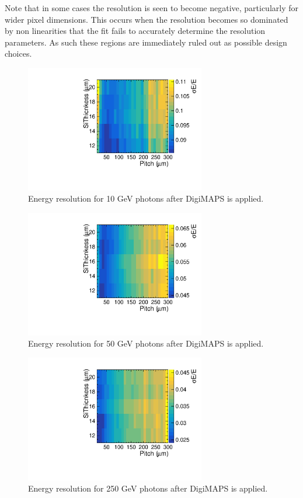 Note that in some cases the resolution is seen to become negative, particularly for wider pixel dimensions. This occurs when the resolution becomes so dominated by non linearities that the fit fails to accurately determine the resolution parameters. As such these regions are immediately ruled out as possible design choices.

\begin{figure}
  \centering
  \includegraphics[width=0.7\textwidth,keepaspectratio]{DECALStudies/fig/FullDigiRes10.pdf}
  \caption{Energy resolution for 10 GeV photons after DigiMAPS is applied.}
  \label{fig:resolution10Digi}
\end{figure}

\begin{figure}
  \centering
  \includegraphics[width=0.7\textwidth,keepaspectratio]{DECALStudies/fig/FullDigiRes50.pdf}
  \caption{Energy resolution for 50 GeV photons after DigiMAPS is applied.}
  \label{fig:resolution50Digi}
\end{figure}

\begin{figure}
  \centering
  \includegraphics[width=0.7\textwidth,keepaspectratio]{DECALStudies/fig/FullDigiRes250.pdf}
  \caption{Energy resolution for 250 GeV photons after DigiMAPS is applied.}
  \label{fig:resolution250Digi}
\end{figure}

